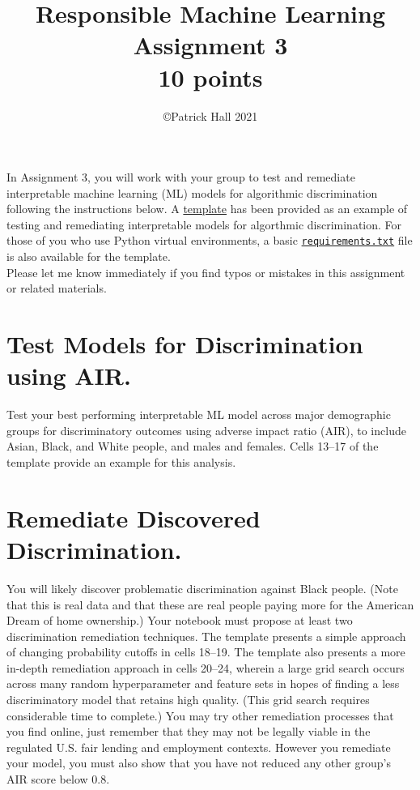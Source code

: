 \documentclass[fleqn]{article}
\title{Responsible Machine Learning\\\Large{Assignment 3}\\\Large{10 points}}
\author{\copyright Patrick Hall 2021}
\begin{document}
\maketitle

\noindent In Assignment 3, you will work with your group to test and remediate interpretable machine learning (ML) models for algorithmic discrimination following the instructions below. A \href{https://nbviewer.jupyter.org/github/jphall663/GWU_rml/blob/master/assignments/assignment_3/assign_3_template.ipynb?flush_cache=true}{template} has been provided as an example of testing and remediating interpretable models for algorthmic discrimination. For those of you who use Python virtual environments, a basic \href{https://github.com/jphall663/GWU_rml/blob/master/assignments/requirements.txt}{\texttt{requirements.txt}} file is also available for the template.\\

\noindent Please let me know immediately if you find typos or mistakes in this assignment or related materials. 

\section{Test Models for Discrimination using AIR.}

Test your best performing interpretable ML model across major demographic groups for discriminatory outcomes using adverse impact ratio (AIR), to include Asian, Black, and White people, and males and females. Cells 13--17 of the template provide an example for this analysis. 

\section{Remediate Discovered Discrimination.}

You will likely discover problematic discrimination against Black people. (Note that this is real data and that these are real people paying more for the American Dream of home ownership.) Your notebook must propose at least two discrimination remediation techniques. The template presents a simple approach of changing probability cutoffs in cells 18--19. The template also presents a more in-depth remediation approach in cells 20--24, wherein a large grid search occurs across many random hyperparameter and feature sets in hopes of finding a less discriminatory model that retains high quality. (This grid search requires considerable time to complete.) You may try other remediation processes that you find online, just remember that they may not be legally viable in the regulated U.S. fair lending and employment contexts. However you remediate your model, you must also show that you have not reduced any other group's AIR score below 0.8. 
\end{document}
